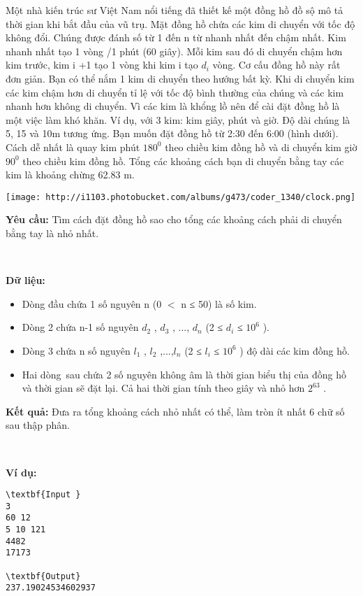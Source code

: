 

Một nhà kiến trúc sư Việt Nam nổi tiếng đã thiết kế một đồng hồ đồ sộ mô tả thời gian khi bắt đầu của vũ trụ. Mặt đồng hồ chứa các kim di chuyển với tốc độ không đổi. Chúng được đánh số từ 1 đến n từ nhanh nhất đến chậm nhất. Kim nhanh nhất tạo 1 vòng /1 phút (60 giây). Mỗi kim sau đó di chuyển chậm hơn kim trước, kim i +1 tạo 1 vòng khi kim i tạo $d_{i}$ vòng. Cơ cấu đồng hồ này rất đơn giản. Bạn có thể nắm 1 kim di chuyển theo hướng bất kỳ. Khi di chuyển kim các kim chậm hơn di chuyển tỉ lệ với tốc độ bình thường của chúng và các kim nhanh hơn không di chuyển. Vì các kim là khổng lồ nên để cài đặt đồng hồ là một việc làm khó khăn. Ví dụ, với 3 kim: kim giây, phút và giờ. Độ dài chúng là 5, 15 và 10m tương ứng. Bạn muốn đặt đồng hồ từ 2:30 đến 6:00 (hình dưới). Cách dễ nhất là quay kim phút $180^{0}$ theo chiều kim đồng hồ và di chuyển kim giờ $90^{0}$ theo chiều kim đồng hồ. Tổng các khoảng cách bạn di chuyển bằng tay các kim là khoảng chừng 62.83 m.


\texttt{[image: http://i1103.photobucket.com/albums/g473/coder\_1340/clock.png]}

\textbf{Yêu cầu: } Tìm cách đặt đồng hồ sao cho tổng các khoảng cách phải di chuyển bằng tay là nhỏ nhất.

 

\textbf{Dữ liệu: }
\begin{itemize}
	\item Dòng đầu chứa 1 số nguyên n (0 $<$ n ≤ 50) là số kim.
	\item Dòng 2 chứa n-1 số nguyên $d_{2}$ , $d_{3}$ , ..., $d_{n}$ (2 ≤ $d_{i}$ ≤ $10^{6}$ ).
	\item Dòng 3 chứa n số nguyên $l_{1}$ , $l_{2}$ ,...,$l_{n}$ (2 ≤ $l_{i}$ ≤ $10^{6}$ ) độ dài các kim đồng hồ.
	\item Hai dòng sau chứa 2 số nguyên không âm là thời gian biểu thị của đồng hồ và thời gian sẽ đặt lại. Cả hai thời gian tính theo giây và nhỏ hơn $2^{63}$ .
\end{itemize}

\textbf{Kết quả: } Đưa ra tổng khoảng cách nhỏ nhất có thể, làm tròn ít nhất 6 chữ số sau thập phân.

 

\textbf{Ví dụ: }
\begin{verbatim}
\textbf{Input }
3
60 12
5 10 121
4482
17173

\textbf{Output}
237.19024534602937\end{verbatim}

